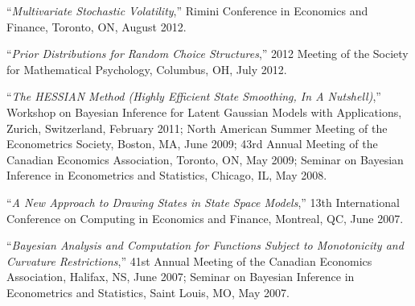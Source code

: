 \documentclass[12pt]{article}
\begin{document}
``{\it Multivariate Stochastic Volatility},''
Rimini Conference in Economics and Finance,
Toronto, ON,
August 2012.

``{\it Prior Distributions for Random Choice Structures},''
2012 Meeting of the Society for Mathematical Psychology,
Columbus, OH,
July 2012.

``{\it The HESSIAN Method (Highly Efficient State Smoothing, In A Nutshell)},''
Workshop on Bayesian Inference for Latent Gaussian Models with Applications,
Zurich, Switzerland,
February 2011;
North American Summer Meeting of the Econometrics Society,
Boston, MA,
June 2009;
43rd Annual Meeting of the Canadian Economics Association,
Toronto, ON,
May 2009;
Seminar on Bayesian Inference in Econometrics and Statistics,
Chicago, IL,
May 2008.

``{\it A New Approach to Drawing States in State Space Models},''
13th International Conference on Computing in Economics and Finance,
Montreal, QC,
June 2007.

``{\it Bayesian Analysis and Computation for Functions Subject to Monotonicity and Curvature Restrictions},''
41st Annual Meeting of the Canadian Economics Association,
Halifax, NS,
June 2007;
Seminar on Bayesian Inference in Econometrics and Statistics,
Saint Louis, MO,
May 2007.




\end{document}
